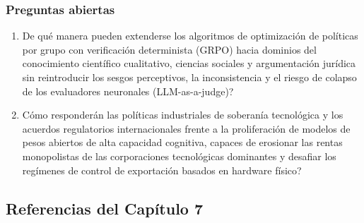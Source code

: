 \subsubsection*{Preguntas abiertas}
\begin{enumerate}[label=\arabic*., leftmargin=2em, itemsep=0.15cm]
    \item \textquestiondown De qué manera pueden extenderse los algoritmos de optimización de políticas por grupo con verificación determinista (GRPO) hacia dominios del conocimiento científico cualitativo, ciencias sociales y argumentación jurídica sin reintroducir los sesgos perceptivos, la inconsistencia y el riesgo de colapso de los evaluadores neuronales (LLM-as-a-judge)?
    \item \textquestiondown Cómo responderán las políticas industriales de soberanía tecnológica y los acuerdos regulatorios internacionales frente a la proliferación de modelos de pesos abiertos de alta capacidad cognitiva, capaces de erosionar las rentas monopolistas de las corporaciones tecnológicas dominantes y desafiar los regímenes de control de exportación basados en hardware físico?
\end{enumerate}

\newpage
\subsection*{Referencias del Capítulo 7}

